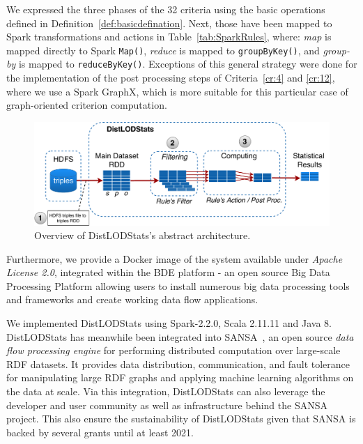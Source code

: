 We expressed the three phases of the 32 criteria using the basic operations defined in Definition~\ref{def:basicdefination}.
Next, those have been mapped to Spark transformations and actions in Table~\ref{tab:SparkRules}, where: \textit{map} is mapped directly to Spark \verb|Map()|, \textit{reduce} is mapped to \verb|groupByKey()|, and \textit{group-by} is mapped to \verb|reduceByKey()|.
Exceptions of this general strategy were done for the implementation of the post processing steps of Criteria~\ref{cr:4} and \ref{cr:12}, where we use a Spark GraphX, which is more suitable for this particular case of graph-oriented criterion computation.


\begin{figure}
\centering
\includegraphics[width=1.0\textwidth]{images/4_distlodstats/distlodstats-system.pdf}
\caption{Overview of DistLODStats's abstract architecture.}
\label{fig:DistLODStatsSystem}
\end{figure}
Furthermore, we provide a Docker image of the system available under \textit{Apache License 2.0}, integrated within the BDE platform - an open source Big Data Processing Platform allowing users to install numerous big data processing tools and frameworks and create working data flow applications.

We implemented DistLODStats using Spark-2.2.0, Scala 2.11.11 and Java 8. 
DistLODStats has meanwhile been integrated into SANSA~\cite{lehmann-2017-sansa-iswc,iermilov-2017-sansa-iswc-demo}, an open source \emph{data flow processing engine} for performing distributed computation over large-scale RDF datasets. It provides data distribution, communication, and fault tolerance for manipulating large RDF graphs and applying machine learning algorithms on the data at scale. Via this integration, DistLODStats can also leverage the developer and user community as well as infrastructure behind the SANSA project. This also ensure the sustainability of DistLODStats given that SANSA is backed by several grants until at least 2021.



